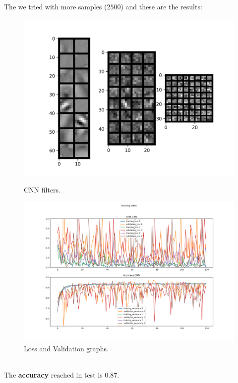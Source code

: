 \documentclass{report}
\def\weight{0.7}
\begin{document}
The we tried with more samples ($2500$) and these are the results:\\
\begin{figure}[ht!]
  \centering
  \begin{minipage}[b]{\weight\linewidth}
    \includegraphics[width=\linewidth]{4.CNN_2500_sample/CNN_filters.png}
    \caption{CNN filters.}
    \label{fig:image1}
  \end{minipage}
  \hspace{0.5cm}
  \begin{minipage}[b]{\weight\linewidth}
    \includegraphics[width=\linewidth]{4.CNN_2500_sample/training_infos.png}
    \caption{Loss and Validation graphs.}
    \label{fig:image2}
  \end{minipage}
\end{figure}\\
The \textbf{accuracy} reached in test is $0.87$.\\
\pagebreak
\end{document}
